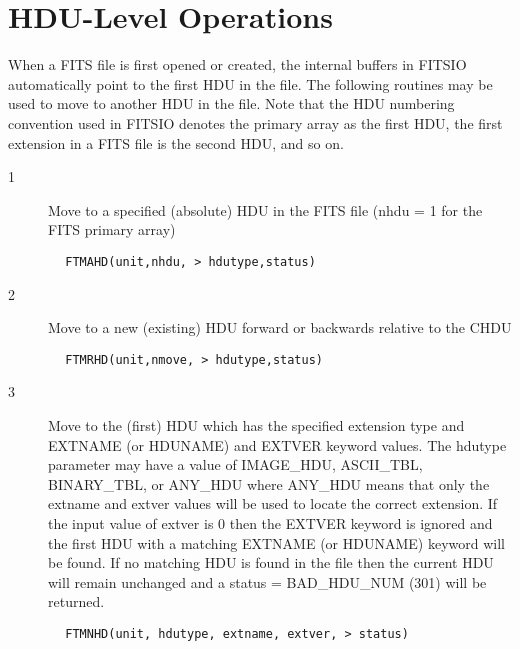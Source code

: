 \documentclass[11pt]{book}
\begin{document}
\section{HDU-Level Operations \label{FTMAHD}}

When a FITS file is first opened or created, the internal buffers in
FITSIO automatically point to the first HDU in the file.  The following
routines may be used to move to another HDU in the file.  Note that
the HDU numbering convention used in FITSIO  denotes the primary array
as the first HDU, the first extension in a FITS file is the second HDU,
and so on.


\begin{description}
\item[1 ] Move to a specified (absolute) HDU in the FITS file (nhdu = 1 for the
   FITS primary array)
\end{description}

\begin{verbatim}
        FTMAHD(unit,nhdu, > hdutype,status)
\end{verbatim}

\begin{description}
\item[2 ]Move to a new (existing) HDU forward or backwards relative to the CHDU
\end{description}

\begin{verbatim}
        FTMRHD(unit,nmove, > hdutype,status)
\end{verbatim}

\begin{description}
\item[3 ] Move to the (first) HDU which has the specified extension type and
    EXTNAME (or HDUNAME) and EXTVER keyword values.  The hdutype parameter
    may have
    a value of IMAGE\_HDU, ASCII\_TBL, BINARY\_TBL, or ANY\_HDU where
    ANY\_HDU means that only the extname and extver values will be
    used to locate the correct extension.  If the input value of
    extver is 0 then the EXTVER keyword is ignored and the first HDU
    with a matching EXTNAME (or HDUNAME) keyword will be found.  If no
    matching HDU is found in the file then the current HDU will remain
    unchanged
   and a status = BAD\_HDU\_NUM (301) will be returned.
\end{description}

\begin{verbatim}
        FTMNHD(unit, hdutype, extname, extver, > status)
\end{verbatim}
\end{document}
